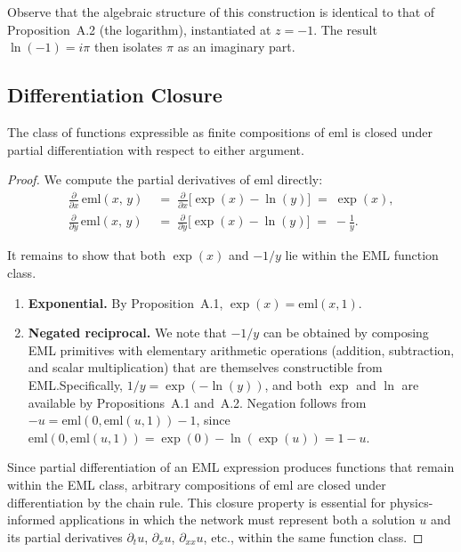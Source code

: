 \begin{remark}
Observe that the algebraic structure of this construction is identical to that of Proposition~A.2 (the logarithm), instantiated at $z = -1$.  The result $\ln(-1) = i\pi$ then isolates $\pi$ as an imaginary part.
\end{remark}

\subsection{Differentiation Closure}
\label{sec:proof-diff-closure}

\begin{proposition}
The class of functions expressible as finite compositions of $\mathrm{eml}$ is closed under partial differentiation with respect to either argument.
\end{proposition}

\begin{proof}
We compute the partial derivatives of $\mathrm{eml}$ directly:
\begin{align}
    \frac{\partial}{\partial x}\,\mathrm{eml}(x,\, y)
    &\;=\; \frac{\partial}{\partial x}\big[\exp(x) - \ln(y)\big]
    \;=\; \exp(x), \label{eq:deml-dx} \\[4pt]
    \frac{\partial}{\partial y}\,\mathrm{eml}(x,\, y)
    &\;=\; \frac{\partial}{\partial y}\big[\exp(x) - \ln(y)\big]
    \;=\; -\frac{1}{y}. \label{eq:deml-dy}
\end{align}

It remains to show that both $\exp(x)$ and $-1/y$ lie within the EML function class.

\begin{enumerate}
    \item \textbf{Exponential.}  By Proposition~A.1, $\exp(x) = \mathrm{eml}(x, 1)$.

    \item \textbf{Negated reciprocal.}  We note that $-1/y$ can be obtained by composing EML primitives with elementary arithmetic operations (addition, subtraction, and scalar multiplication) that are themselves constructible from EML.\@ Specifically, $1/y = \exp(-\ln(y))$, and both $\exp$ and $\ln$ are available by Propositions~A.1 and~A.2.  Negation follows from $-u = \mathrm{eml}(0, \mathrm{eml}(u, 1)) - 1$, since $\mathrm{eml}(0, \mathrm{eml}(u, 1)) = \exp(0) - \ln(\exp(u)) = 1 - u$.
\end{enumerate}

Since partial differentiation of an EML expression produces functions that remain within the EML class, arbitrary compositions of $\mathrm{eml}$ are closed under differentiation by the chain rule.  This closure property is essential for physics-informed applications in which the network must represent both a solution $u$ and its partial derivatives $\partial_t u$, $\partial_x u$, $\partial_{xx} u$, etc., within the same function class.
\end{proof}

